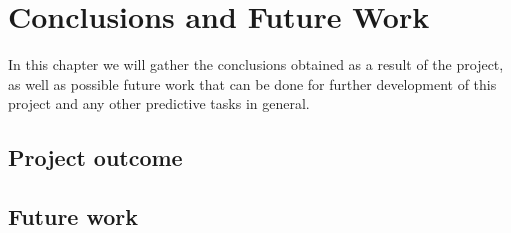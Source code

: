 \chapter{Conclusions and Future Work}
\label{chap:conclusions}
\begin{chapterintro}
In this chapter we will gather the conclusions obtained as a result of the project, as well as possible future work that can be done for further development of this project and any other predictive tasks in general.
\end{chapterintro}
\section{Project outcome}

\section{Future work}